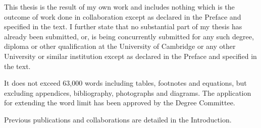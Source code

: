 \dedication{\raggedleft\emph{To all those who supported and believed in me.}}



% 

\maketitle


\begingroup

  \let\cleardoublepage\clearpage


This thesis is the result of my own work and includes nothing which is the
outcome of work done in collaboration except as declared in the Preface and
specified in the text. I further state that no substantial part of my thesis
has already been submitted, or, is being concurrently submitted for any such
degree, diploma or other qualification at the University of Cambridge or any
other University or similar institution except as declared in the Preface and
specified in the text.

It does not exceed 63,000 words including tables, footnotes and equations, but
excluding appendices, bibliography, photographs and diagrams. The application
for extending the word limit has been approved by the Degree Committee.

Previous publications and collaborations are detailed in the Introduction.

